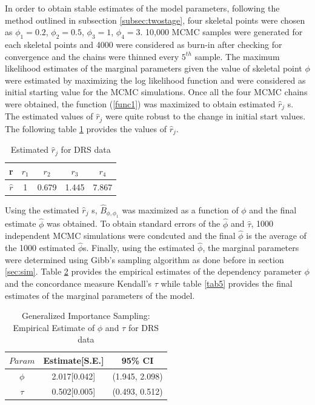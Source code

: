 \documentclass[11pt]{article}
\theoremstyle{remboldstyle}
\begin{document}
\noindent
In order to obtain stable estimates of the model parameters, following the method outlined in subsection \ref{subsec:twostage}, four skeletal points were chosen as $\phi_1= 0.2$, $\phi_2= 0.5$, $\phi_3= 1$, $\phi_4 = 3$. 10,000 MCMC samples were generated for each skeletal points and 4000 were considered as burn-in after checking for convergence and the chains were thinned every $5^{th}$ sample. The maximum likelihood estimates of the marginal parameters given the value of skeletal point $\phi$ were estimated by maximizing the log likelihood function and were considered as initial starting value for the MCMC simulations. Once all the four MCMC chains were obtained, the function (\ref{func1}) was maximized to obtain estimated $\hat{r}_j$ s. The estimated values of $\hat{r}_j$  were quite robust to the change in initial start values. The following table \ref{tab4} provides the values of $\hat{r}_j$. 
\begin{table}[H]
\caption{Estimated $\hat{r}_j$ for DRS data}
\centering
\begin{tabular}{c c c c c}
\hline
r    & $r_1$  & $r_2$  & $r_3$  & $r_4$ \\
\hline
$\hat{r}$ & 1&  0.679 &  1.445  & 7.867 \\
 \hline             
\end{tabular}
\label{tab4}
\end{table}

\noindent
Using the estimated $\hat{r}_j$ s, $\hat{B}_{\phi, \phi_1}$ was maximized as a function of $\phi$ and the final estimate $\hat{\phi}$ was obtained. To obtain standard errors of the $\hat{\phi}$ and $\hat{\tau}$, 1000 independent MCMC simulations were condcuted and the final $\hat{\phi}$ is the average of the 1000 estimated $\hat{\phi}$s. Finally, using the estimated $\hat{\phi}$, the marginal parameters were determined using Gibb's sampling algorithm as done before in section \ref{sec:sim}. Table \ref{tab51} provides the empirical estimates of the dependency parameter $\phi$ and the concordance measure Kendall's $\tau$ while table \ref{tab5} provides the final estimates of the  marginal parameters of the model. 

\begin{table}[H]
\caption{Generalized Importance Sampling: Empirical Estimate of $\phi$ and $\tau$ for DRS data}
\centering
\begin{tabular}{c c c}
\hline
$Param$      & Estimate[S.E.] & 95\% CI\\
\hline
$\phi$ & 2.017[0.042]            & (1.945, 2.098)\\
$\tau$ & 0.502[0.005]             & (0.493, 0.512)\\
 \hline             
\end{tabular}
\label{tab51}
\end{table}
\end{document}
